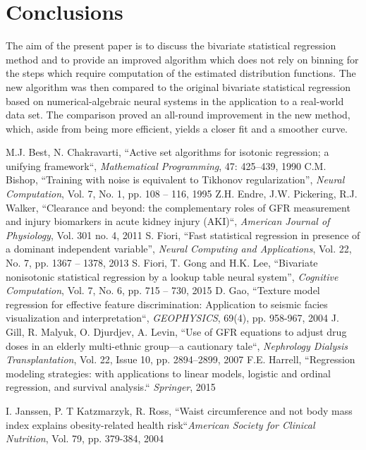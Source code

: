 \documentclass[10pt,final]{siamltex}
\begin{document}
\section{Conclusions}\label{conclusion}
%
The aim of the present paper is to discuss the bivariate statistical regression method and to provide an improved algorithm which does not rely on binning for the steps which require computation of the estimated distribution functions. The new algorithm was then compared to the original bivariate statistical regression based on numerical-algebraic neural systems in the application to a real-world data set. The comparison proved an all-round improvement in the new method, which, aside from being more efficient, yields a closer fit and a smoother curve.
%
\begin{thebibliography}{99}
   M.J. Best, N. Chakravarti, ``Active set algorithms for isotonic regression; a unifying framework``, \textit{Mathematical Programming}, 47: 425–439, 1990
   C.M. Bishop, ``Training with noise is equivalent to Tikhonov regularization'', \textit{Neural Computation}, Vol. 7, No. 1, pp. 108 -- 116, 1995
  Z.H. Endre, J.W. Pickering, R.J. Walker, ``Clearance and beyond: the complementary roles of GFR measurement and injury biomarkers in acute kidney injury (AKI)``, \textit{American Journal of Physiology}, Vol. 301 no. 4, 2011
   S. Fiori, ``Fast statistical regression in presence of a dominant independent variable'', \textit{Neural Computing and Applications}, Vol. 22, No. 7, pp. 1367 -- 1378, 2013
   S. Fiori, T. Gong and H.K. Lee, ``Bivariate nonisotonic statistical regression by a lookup table neural system'', \textit{Cognitive Computation}, Vol. 7, No. 6, pp. 715 -- 730, 2015
   D. Gao, ``Texture model regression for effective feature discrimination: Application to seismic facies visualization and interpretation``, \textit{GEOPHYSICS}, 69(4), pp. 958-967, 2004
  J. Gill, R. Malyuk, O. Djurdjev, A. Levin, ``Use of GFR equations to adjust drug doses in an elderly multi-ethnic group—a cautionary tale``, \textit{Nephrology Dialysis Transplantation}, Vol. 22, Issue 10, pp. 2894–2899, 2007
  F.E. Harrell, ``Regression modeling strategies: with applications to linear models, logistic and ordinal regression, and survival analysis.`` \textit{Springer}, 2015

   I. Janssen, P. T Katzmarzyk, R. Ross, ``Waist circumference and not body mass index explains obesity-related health risk``\textit{American Society for Clinical Nutrition}, Vol. 79, pp. 379-384, 2004


\end{thebibliography}
\end{document}
